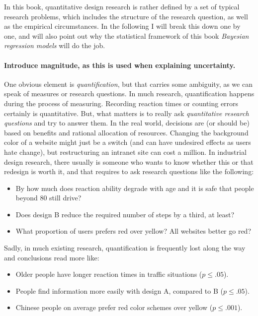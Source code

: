 \documentclass[]{svmono}
\providecommand{\tightlist}{%
  \setlength{\itemsep}{0pt}\setlength{\parskip}{0pt}}
\let\oldparagraph\paragraph
\renewcommand{\paragraph}[1]{\oldparagraph{#1}\mbox{}}
\theoremstyle{definition}
\theoremstyle{definition}
\theoremstyle{definition}
\theoremstyle{remark}
\begin{document}
In this book, quantitative design research is rather defined by a set of
typical research problems, which includes the structure of the research
question, as well as the empirical circumstances. In the following I
will break this down one by one, and will also point out why the
statistical framework of this book \emph{Bayesian regression models}
will do the job.

\paragraph{Introduce magnitude, as this is used when explaining
uncertainty.}\label{introduce-magnitude-as-this-is-used-when-explaining-uncertainty.}

One obvious element is \emph{quantification}, but that carries some
ambiguity, as we can speak of measures or research questions. In much
research, quantification happens during the process of measuring.
Recording reaction times or counting errors certainly is quantitative.
But, what matters is to really ask \emph{quantitative research
questions} and try to answer them. In the real world, decisions are (or
should be) based on benefits and rational allocation of resources.
Changing the background color of a website might just be a switch (and
can have undesired effects as users hate change), but restructuring an
intranet site can cost a million. In industrial design research, there
usually is someone who wants to know whether this or that redesign is
worth it, and that requires to ask research questions like the
following:

\begin{itemize}
\tightlist
\item
  By how much does reaction ability degrade with age and it is safe that
  people beyond 80 still drive?
\item
  Does design B reduce the required number of steps by a third, at
  least?
\item
  What proportion of users prefers red over yellow? All websites better
  go red?
\end{itemize}

Sadly, in much existing research, quantification is frequently lost
along the way and conclusions read more like:

\begin{itemize}
\tightlist
\item
  Older people have longer reaction times in traffic situations
  (\(p \leq .05\)).
\item
  People find information more easily with design A, compared to B
  (\(p \leq .05\)).
\item
  Chinese people on average prefer red color schemes over yellow
  (\(p \leq .001\)).
\end{itemize}
\end{document}

